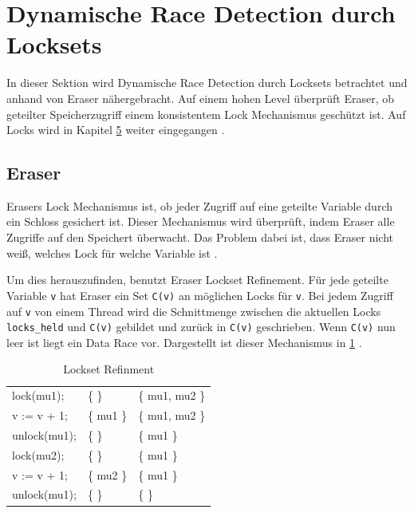 \section{Dynamische Race Detection durch Locksets}

In dieser Sektion wird Dynamische Race Detection durch Locksets betrachtet und anhand von Eraser nähergebracht. Auf einem hohen Level überprüft Eraser, ob geteilter Speicherzugriff einem konsistentem Lock Mechanismus geschützt ist. Auf Locks wird in Kapitel \hyperref[sec:loesen]{5} weiter eingegangen \cite[vgl.][392]{savage_eraser_nodate}.

\subsection*{Eraser}

Erasers Lock Mechanismus ist, ob jeder Zugriff auf eine geteilte Variable durch ein Schloss gesichert ist. Dieser Mechanismus wird überprüft, indem Eraser alle Zugriffe auf den Speichert überwacht. Das Problem dabei ist, dass Eraser nicht weiß, welches Lock für welche Variable ist \cite[vgl.][396]{savage_eraser_nodate}. 

Um dies herauszufinden, benutzt Eraser Lockset Refinement. Für jede geteilte Variable \texttt{v} hat Eraser ein Set \texttt{C(v)} an möglichen Locks für \texttt{v}. Bei jedem Zugriff auf \texttt{v} von einem Thread wird die Schnittmenge zwischen die aktuellen Locks \texttt{locks\_held} und \texttt{C(v)} gebildet und zurück in \texttt{C(v)} geschrieben. Wenn \texttt{C(v)} nun leer ist liegt ein Data Race vor. Dargestellt ist dieser Mechanismus in \ref{tab:locksetRefinment} \cite[vgl.][396-397]{savage_eraser_nodate}. 

\begin{table}[h]
    \myfloatalign
    \begin{tabularx}{\textwidth}{XXX} \toprule
        \tableheadline{Program} & \tableheadline{locks\_held}
        & \tableheadline{C(v)} \\ 
        \midrule
        lock(mu1); & \{ \} &  \{ mu1, mu2 \} \\
        v := v + 1; & \{ mu1 \} & \{ mu1, mu2 \} \\
        unlock(mu1); & \{ \} & \{ mu1 \} \\
        \midrule
        lock(mu2); & \{ \} & \{ mu1 \} \\
        v := v + 1; & \{ mu2 \} & \{ mu1 \} \\
        unlock(mu1); & \{ \} & \{ \} \\
        \bottomrule
    \end{tabularx}
    \caption[Lockset Refinment]{Lockset Refinment \cite[397]{savage_eraser_nodate}}
    \label{tab:locksetRefinment}
\end{table}

